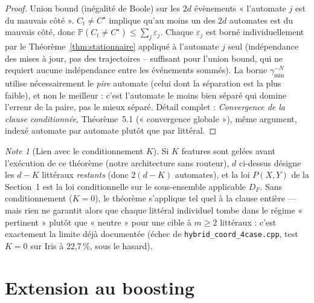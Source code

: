 \documentclass[12pt,a4paper]{article}
\theoremstyle{remark}
\newtheorem{note}{Note}[section]
\begin{document}
\begin{proof}
Union bound (inégalité de Boole) sur les $2d$ évènements « l'automate $j$ est
du mauvais côté ». $C_t\ne C^\star$ implique qu'au moins un des $2d$ automates
est du mauvais côté, donc $\mathbb P(C_t\ne C^\star)\le\sum_j\varepsilon_j$.
Chaque $\varepsilon_j$ est borné individuellement par le
Théorème~\ref{thm:stationnaire} appliqué à l'automate $j$ seul (indépendance
des mises à jour, pas des trajectoires -- suffisant pour l'union bound, qui ne
requiert aucune indépendance entre les événements sommés). La borne
$\gamma_{\min}^{-N}$ utilise nécessairement le \emph{pire} automate (celui dont
la séparation est la plus faible), et non le meilleur : c'est l'automate le
moins bien séparé qui domine l'erreur de la paire, pas le mieux séparé. Détail
complet : \textit{Convergence de la clause conditionnée}, Théorème~5.1
(« convergence globale »), même argument, indexé automate par automate plutôt
que par littéral.
\end{proof}

\begin{note}[Lien avec le conditionnement $K$]
Si $K$ features sont gelées avant l'exécution de ce théorème (notre
architecture sans routeur), $d$ ci-dessus désigne les $d-K$ littéraux
\emph{restants} (donc $2(d-K)$ automates), et la loi $P(X,Y)$ de la Section~1
est la loi conditionnelle sur le sous-ensemble applicable $D_F$. Sans
conditionnement ($K=0$), le théorème s'applique tel quel à la clause entière
--- mais rien ne garantit alors que chaque littéral individuel tombe dans le
régime « pertinent » plutôt que « neutre » pour une cible à $m\ge2$ littéraux :
c'est exactement la limite déjà documentée (échec de
\texttt{hybrid\_coord\_4case.cpp}, test $K{=}0$ sur Iris à 22,7\,\%, sous le
hasard).
\end{note}

\section{Extension au boosting}
\end{document}
